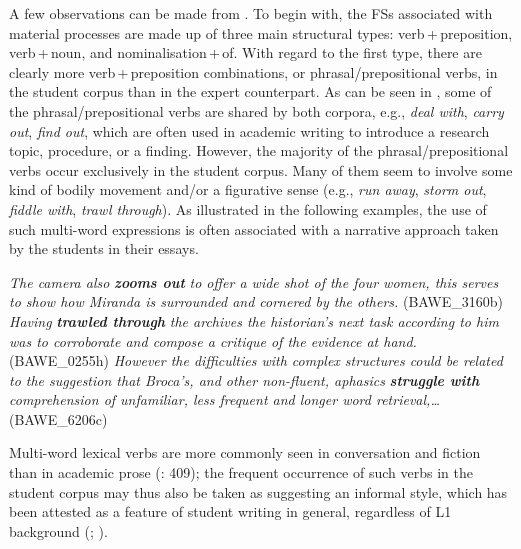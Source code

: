 \documentclass[output=paper]{langscibook}
\begin{document}
A few observations can be made from . To begin with, the FSs associated with material processes are made up of three main structural types: verb\,+\,preposition, verb\,+\,noun, and nominalisation\,+\,of. With regard to the first type, there are clearly more verb\,+\,preposition combinations, or phrasal/prepositional verbs, in the student corpus than in the expert counterpart. As can be seen in , some of the phrasal/prepositional verbs are shared by both corpora, e.g., \textit{deal with}, \textit{carry out}, \textit{find out}, which are often used in academic writing to introduce a research topic, procedure, or a finding. However, the majority of the phrasal/prepositional verbs occur exclusively in the student corpus. Many of them seem to involve some kind of bodily movement and/or a figurative sense (e.g., \textit{run away}, \textit{storm out}, \textit{fiddle with}, \textit{trawl through}). As illustrated in the following examples, the use of such multi-word expressions is often associated with a narrative approach taken by the students in their essays. 

\ea \textit{The camera also} \textbf{\textit{zooms out}} \textit{to offer a wide shot of the four women, this serves to show how Miranda is surrounded and cornered by the others.} (BAWE\_3160b)
\ex \textit{Having} \textbf{\textit{trawled through}} \textit{the archives the historian’s next task according to him was to corroborate and compose a critique of the evidence at hand.} (BAWE\_0255h)
\ex \textit{However the difficulties with complex structures could be related to the suggestion that Broca’s, and other non-fluent, aphasics} \textbf{\textit{struggle with}} \textit{comprehension of unfamiliar, less frequent and longer word retrieval,…} (BAWE\_6206c)
\z

Multi-word lexical verbs are more commonly seen in conversation and fiction than in academic prose (\citealt{BiberEtAl1999}: 409); the frequent occurrence of such verbs in the student corpus may thus also be taken as suggesting an informal style, which has been attested as a feature of student writing in general, regardless of L1 background (\citealt{GrangerRayson1998}; \citealt{GilquinPaquot2008}).
\end{document}
